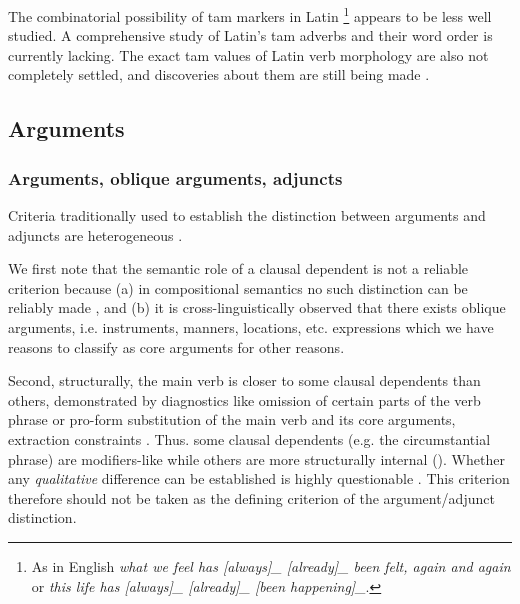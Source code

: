 \documentclass[a4paper, oneside, 12pt]{report}
\newcommand*{\citepage}[1]{p.~{#1}}
\newcommand*{\citepages}[1]{pp.~{#1}}
\newcommand{\form}[1]{\emph{#1}}
\begin{document}
The combinatorial possibility of \ac{tam} markers in Latin%
\footnote{
    As in English \form{what we feel has [always]_{} [already]_{} been felt, again and again} or 
    \form{this life has [always]_{} [already]_{\text{anteriority}} [been happening]_{\text{progressive}}}.
}
appears to be less well studied.
A comprehensive study of Latin's \ac{tam} adverbs and their word order is currently lacking.
The exact \ac{tam} values of Latin verb morphology are also not completely settled, and discoveries about them are still being made \citep{dyck2017oxford}.

\subsection{Arguments}\label{sec:grammatical.clause.argument}

\subsubsection{Arguments, oblique arguments, adjuncts}\label{sec:grammatical.clause.peripheral.distinction}


Criteria traditionally used to establish the distinction between arguments and adjuncts are heterogeneous \citet{mcinnerney2022argument}.

We first note that the semantic role of a clausal dependent is not a reliable criterion because (a) in compositional semantics no such distinction can be reliably made \citep[\citepages{24-27}]{mcinnerney2022argument}, and (b) it is cross-linguistically observed that there exists oblique arguments, i.e. instruments, manners, locations, etc. expressions which we have reasons to classify as core arguments for other reasons.

Second, structurally, the main verb is closer to some clausal dependents than others,
demonstrated by diagnostics like omission of certain parts of the verb phrase or pro-form substitution of the main verb and its core arguments, extraction constraints \citep[\citepages{106-108}]{mcinnerney2022argument}.
Thus. some clausal dependents (e.g. the circumstantial phrase) are modifiers-like while others are more structurally internal (\citealt[\citepage{29}]{cinque1999adverbs}).
Whether any \emph{qualitative} difference can be established is highly questionable \citep[\citepages{128,212}]{mcinnerney2022argument}.
This criterion therefore should not be taken as the defining criterion of the argument/adjunct distinction.
\end{document}

